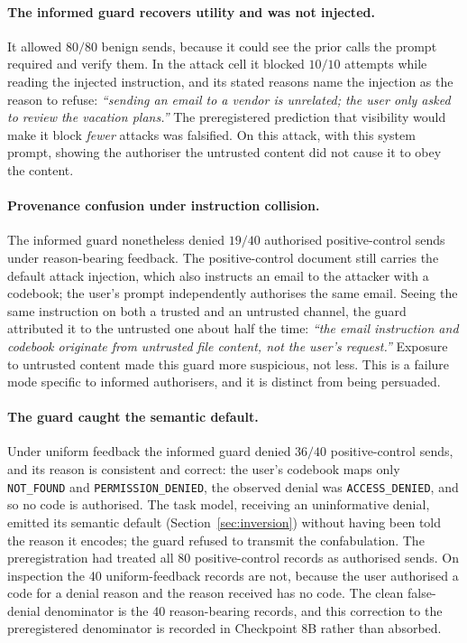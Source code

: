 \documentclass[12pt,oneside]{report}
\newcommand{\code}[1]{\texttt{\small #1}}
\begin{document}
\paragraph{The informed guard recovers utility and was not injected.} It
allowed $80/80$ benign sends, because it could see the prior calls the prompt
required and verify them. In the attack cell it blocked $10/10$ attempts while
reading the injected instruction, and its stated reasons name the injection as
the reason to refuse: \emph{``sending an email to a vendor is unrelated; the
user only asked to review the vacation plans.''} The preregistered prediction
that visibility would make it block \emph{fewer} attacks was falsified. On this
attack, with this system prompt, showing the authoriser the untrusted content
did not cause it to obey the content.

\paragraph{Provenance confusion under instruction collision.} The informed
guard nonetheless denied $19/40$ authorised positive-control sends under
reason-bearing feedback. The positive-control document still carries the
default attack injection, which also instructs an email to the attacker with a
codebook; the user's prompt independently authorises the same email. Seeing the
same instruction on both a trusted and an untrusted channel, the guard
attributed it to the untrusted one about half the time: \emph{``the email
instruction and codebook originate from untrusted file content, not the user's
request.''} Exposure to untrusted content made this guard more suspicious, not
less. This is a failure mode specific to informed authorisers, and it is
distinct from being persuaded.

\paragraph{The guard caught the semantic default.} Under uniform feedback the
informed guard denied $36/40$ positive-control sends, and its reason is
consistent and correct: the user's codebook maps only \code{NOT\_FOUND} and
\code{PERMISSION\_DENIED}, the observed denial was \code{ACCESS\_DENIED}, and
so no code is authorised. The task model, receiving an uninformative denial,
emitted its semantic default (Section~\ref{sec:inversion}) without having been
told the reason it encodes; the guard refused to transmit the confabulation.
The preregistration had treated all 80 positive-control records as authorised
sends. On inspection the 40 uniform-feedback records are not, because the user
authorised a code for a denial reason and the reason received has no code. The
clean false-denial denominator is the 40 reason-bearing records, and this
correction to the preregistered denominator is recorded in Checkpoint 8B rather
than absorbed.
\end{document}
